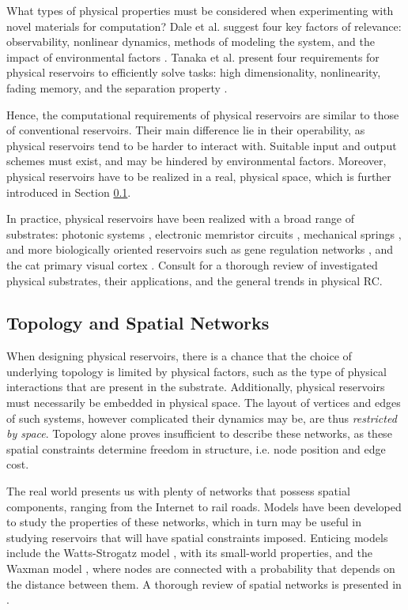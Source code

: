 What types of physical properties must be considered when experimenting with
novel materials for computation? Dale et al. suggest four key factors of
relevance: observability, nonlinear dynamics, methods of modeling the system,
and the impact of environmental factors \cite{adamatzky_reservoir_2017}. Tanaka
et al. present four requirements for physical reservoirs to efficiently solve
tasks: high dimensionality, nonlinearity, fading memory, and the separation
property \cite{tanaka_recent_2018}.

Hence, the computational requirements of physical reservoirs are similar to
those of conventional reservoirs. Their main difference lie in their
operability, as physical reservoirs tend to be harder to interact with. Suitable
input and output schemes must exist, and may be hindered by environmental
factors. Moreover, physical reservoirs have to be realized in a real, physical
space, which is further introduced in Section
\ref{ssec:topology-and-spatial-networks}.

In practice, physical reservoirs have been realized with a broad range of
substrates: photonic systems \cite{vandoorne_experimental_2014}, electronic
memristor circuits \cite{kulkarni_memristor-based_2012}, mechanical springs
\cite{hauser_towards_2011}, and more biologically oriented reservoirs such as
gene regulation networks \cite{jones_is_2007}, and the cat primary visual cortex
\cite{scholkopf_temporal_2007}. Consult \cite{tanaka_recent_2018} for a thorough
review of investigated physical substrates, their applications, and the general
trends in physical RC.

\subsection{Topology and Spatial Networks}
\label{ssec:topology-and-spatial-networks}

When designing physical reservoirs, there is a chance that the choice of
underlying topology is limited by physical factors, such as the type of physical
interactions that are present in the substrate. Additionally, physical
reservoirs must necessarily be embedded in physical space. The layout of
vertices and edges of such systems, however complicated their dynamics may be,
are thus \textit{restricted by space}. Topology alone proves insufficient to
describe these networks, as these spatial constraints determine freedom in
structure, i.e. node position and edge cost.

The real world presents us with plenty of networks that possess spatial
components, ranging from the Internet to rail roads. Models have been developed
to study the properties of these networks, which in turn may be useful in
studying reservoirs that will have spatial constraints imposed. Enticing models
include the Watts-Strogatz model \cite{watts_collective_1998}, with its
small-world properties, and the Waxman model \cite{waxman_routing_1988}, where
nodes are connected with a probability that depends on the distance between
them. A thorough review of spatial networks is presented in
\cite{barthelemy_spatial_2011}.

